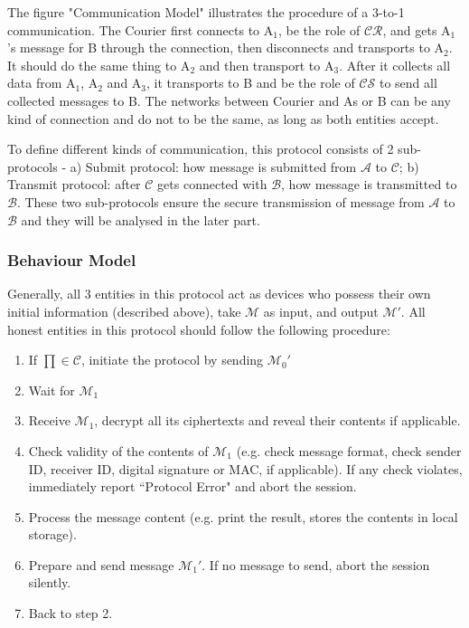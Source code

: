 The figure "Communication Model" illustrates the procedure of a 3-to-1 communication. The Courier first connects to A$_1$, be the role of $\mathcal{CR}$, and gets A$_1$'s message for B through the connection, then disconnects and transports to A$_2$. It should do the same thing to A$_2$ and then transport to A$_3$. After it collects all data from A$_1$, A$_2$ and A$_3$, it transports to B and be the role of $\mathcal{CS}$ to send all collected messages to B. The networks between Courier and As or B can be any kind of connection and do not to be the same, as long as both entities accept. 

To define different kinds of communication, this protocol consists of 2 sub-protocols - a) Submit protocol: how message is submitted from $\mathcal{A}$ to $\mathcal{C}$; b) Transmit protocol: after $\mathcal{C}$ gets connected with $\mathcal{B}$, how message is transmitted to $\mathcal{B}$. These two sub-protocols ensure the secure transmission of message from $\mathcal{A}$ to $\mathcal{B}$ and they will be analysed in the later part.

\subsubsection*{Behaviour Model}
Generally, all 3 entities in this protocol act as devices who possess their own initial information (described above), take $\mathcal{M}$ as input, and output $\mathcal{M'}$. All honest entities in this protocol should follow the following procedure:
\begin{enumerate}
\item If $\prod \in \mathcal{C}$, initiate the protocol by sending ${\mathcal{M}_0}'$
\item Wait for $\mathcal{M}_1$
\item Receive $\mathcal{M}_1$, decrypt all its ciphertexts and reveal their contents if applicable.
\item Check validity of the contents of $\mathcal{M}_1$ (e.g. check message format, check sender ID, receiver ID, digital signature or MAC, if applicable). If any check violates, immediately report ``Protocol Error" and abort the session.
\item Process the message content (e.g. print the result, stores the contents in local storage).
\item Prepare and send message ${\mathcal{M}_1}'$. If no message to send, abort the session silently.
\item Back to step 2.
\end{enumerate}

